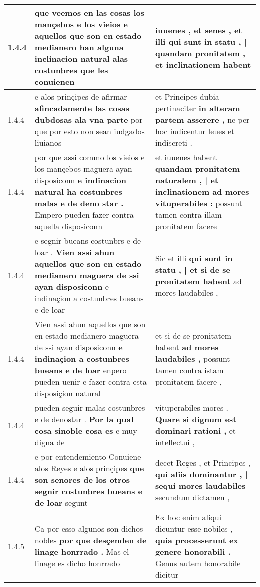 \begin{tabular}{|p{1cm}|p{6.5cm}|p{6.5cm}|}
1.4.4 & que veemos en las cosas los mançebos e los vieios \textbf{ e aquellos que son en estado medianero han alguna inclinacion natural alas costunbres } que les conuienen & iuuenes , et senes , \textbf{ et illi qui sunt in statu , | quandam pronitatem , } et inclinationem habent \\\hline
1.4.4 & e alos prinçipes de afirmar \textbf{ afincadamente las cosas dubdosas ala vna parte } por que por esto non sean iudgados liuianos & et Principes dubia pertinaciter \textbf{ in alteram partem asserere , } ne per hoc iudicentur leues et indiscreti . \\\hline
1.4.4 & por que assi commo los vieios e los mançebos maguera ayan disposiconn \textbf{ e indinacion natural ha costunbres malas e de deno star . } Empero pueden fazer contra aquella disposiconn & et iuuenes habent \textbf{ quandam pronitatem naturalem , | et inclinationem ad mores vituperabiles : } possunt tamen contra illam pronitatem facere \\\hline
1.4.4 & e segnir bueans costunbrs e de loar . \textbf{ Vien assi ahun aquellos que son en estado medianero maguera de ssi ayan disposiconn } e indinaçion a costunbres bueans e de loar & Sic et illi \textbf{ qui sunt in statu , | et si de se pronitatem habent } ad mores laudabiles , \\\hline
1.4.4 & Vien assi ahun aquellos que son en estado medianero maguera de ssi ayan disposiconn \textbf{ e indinaçion a costunbres bueans e de loar } enpero pueden uenir e fazer contra esta disposiçion natural & et si de se pronitatem habent \textbf{ ad mores laudabiles , } possunt tamen contra istam pronitatem facere , \\\hline
1.4.4 & pueden seguir malas costunbres e de denostar . \textbf{ Por la qual cosa sinoble cosa es } e muy digna de & vituperabiles mores . \textbf{ Quare si dignum est dominari rationi , } et intellectui , \\\hline
1.4.4 & e por entendemiento Conuiene alos Reyes e alos prinçipes \textbf{ que son senores de los otros segnir costunbres bueans e de loar } segunt & decet Reges , et Principes , \textbf{ qui aliis dominantur , | sequi mores laudabiles } secundum dictamen , \\\hline
1.4.5 & Ca por esso algunos son dichos nobles \textbf{ por que desçenden de linage honrrado . } Mas el linage es dicho honrrado & Ex hoc enim aliqui dicuntur esse nobiles , \textbf{ quia processerunt ex genere honorabili . } Genus autem honorabile dicitur \\\hline

\end{tabular}
